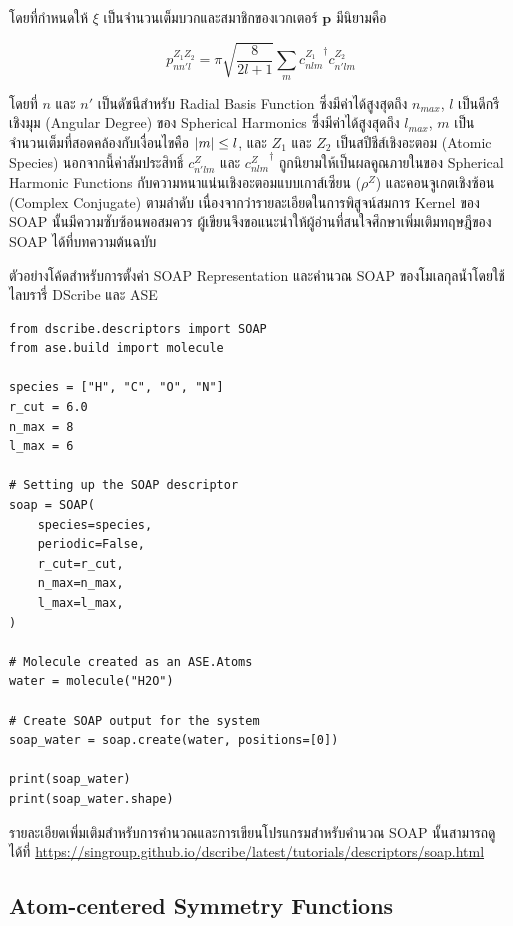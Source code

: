 \noindent โดยที่กำหนดให้ $\xi$ เป็นจำนวนเต็มบวกและสมาชิกของเวกเตอร์ $\mathbf{p}$ มีนิยามคือ 

\begin{equation}\label{eq:soap_power_spec}
    p^{Z_1 Z_2}_{n n' l} = \pi \sqrt{\frac{8}{2l+1}}\sum_m {c^{Z_1}_{n l m}}^{\dagger} c^{Z_2}_{n' l m}
\end{equation}

\noindent โดยที่ $n$ และ $n'$ เป็นดัชนีสำหรับ Radial Basis Function ซึ่งมีค่าได้สูงสุดถึง $n_{max}$, $l$ เป็นดีกรีเชิงมุม 
(Angular Degree) ของ Spherical Harmonics ซึ่งมีค่าได้สูงสุดถึง $l_{max}$, $m$ เป็นจำนวนเต็มที่สอดคล้องกับเงื่อนไขคือ $\abs{m} 
\leq l$, และ $Z_{1}$ และ $Z_{2}$ เป็นสปีชีส์เชิงอะตอม (Atomic Species) นอกจากนี้ค่าสัมประสิทธิ์ $c^{Z}_{n'lm}$ และ 
${c^{Z}_{nlm}}^{\dagger}$ ถูกนิยามให้เป็นผลคูณภายในของ Spherical Harmonic Functions กับความหนาแน่นเชิงอะตอมแบบเกาส์เซียน 
($\rho^Z$) และคอนจูเกตเชิงซ้อน (Complex Conjugate) ตามลำดับ\autocite{de2016} เนื่องจากว่ารายละเอียดในการพิสูจน์สมการ Kernel 
ของ SOAP นั้นมีความซับซ้อนพอสมควร ผู้เขียนจึงขอแนะนำให้ผู้อ่านที่สนใจศึกษาเพิ่มเติมทฤษฎีของ SOAP ได้ที่บทความต้นฉบับ 

ตัวอย่างโค้ดสำหรับการตั้งค่า SOAP Representation และคำนวณ SOAP ของโมเลกุลน้ำโดยใช้ไลบรารี่ DScribe และ ASE

\begin{lstlisting}[style=MyPython]
from dscribe.descriptors import SOAP
from ase.build import molecule

species = ["H", "C", "O", "N"]
r_cut = 6.0
n_max = 8
l_max = 6

# Setting up the SOAP descriptor
soap = SOAP(
    species=species,
    periodic=False,
    r_cut=r_cut,
    n_max=n_max,
    l_max=l_max,
)

# Molecule created as an ASE.Atoms
water = molecule("H2O")

# Create SOAP output for the system
soap_water = soap.create(water, positions=[0])

print(soap_water)
print(soap_water.shape)
\end{lstlisting}

รายละเอียดเพิ่มเติมสำหรับการคำนวณและการเขียนโปรแกรมสำหรับคำนวณ SOAP นั้นสามารถดูได้ที่
\url{https://singroup.github.io/dscribe/latest/tutorials/descriptors/soap.html}

\subsection{Atom-centered Symmetry Functions}
\label{ssec:acsf}

